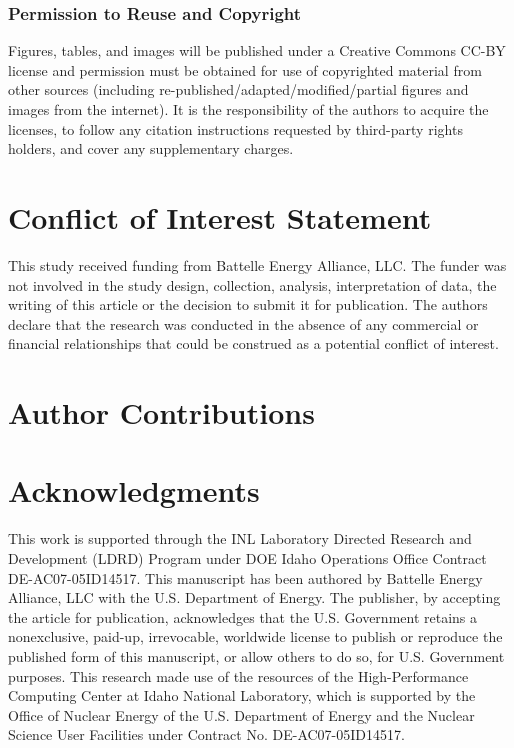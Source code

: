 \documentclass[utf8]{frontiersSCNS} %
\begin{document}
\subsubsection{Permission to Reuse and Copyright}
Figures, tables, and images will be published under a Creative Commons CC-BY license and permission must be obtained for use of copyrighted material from other sources (including re-published/adapted/modified/partial figures and images from the internet). It is the responsibility of the authors to acquire the licenses, to follow any citation instructions requested by third-party rights holders, and cover any supplementary charges.

\section*{Conflict of Interest Statement}

This study received funding from Battelle Energy Alliance, LLC. The funder was not involved in the study design, collection, analysis, interpretation of data, the writing of this article or the decision to submit it for publication. The authors declare that the research was conducted in the absence of any commercial or financial relationships that could be construed as a potential conflict of interest.

\section*{Author Contributions}


\section*{Acknowledgments}
This work is supported through the INL Laboratory Directed Research and Development (LDRD) Program under DOE Idaho Operations Office Contract DE-AC07-05ID14517. This manuscript has been authored by Battelle Energy Alliance, LLC with the U.S. Department of Energy. The publisher, by accepting the article for publication, acknowledges that the U.S. Government retains a nonexclusive, paid-up, irrevocable, worldwide license to publish or reproduce the published form of this manuscript, or allow others to do so, for U.S. Government purposes. This research made use of the resources of the High-Performance Computing Center at Idaho National Laboratory, which is supported by the Office of Nuclear Energy of the U.S. Department of Energy and the Nuclear Science User Facilities under Contract No. DE-AC07-05ID14517. 
\end{document}
